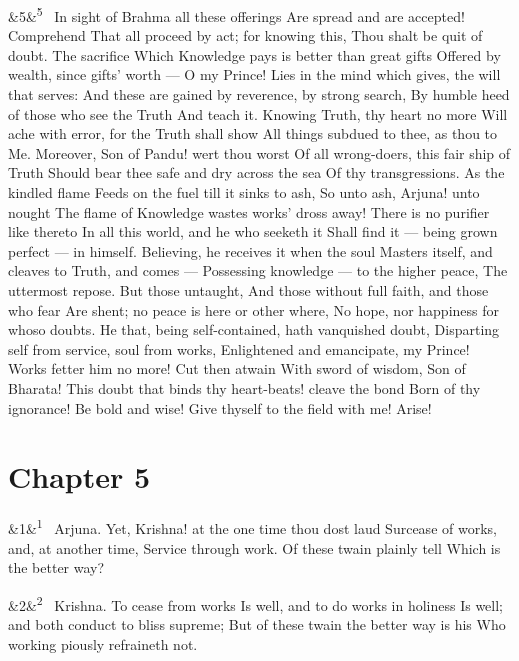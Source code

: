 \documentclass[12pt]{article}
\newcommand{\para}[1][]{\par\noindent\ifx&#1&\else\textsuperscript{\footnotesize #1}~\fi}
\begin{document}
\para[5] In sight of Brahma all these offerings Are spread and are accepted! Comprehend That all proceed by act; for knowing this, Thou shalt be quit of doubt. The sacrifice Which Knowledge pays is better than great gifts Offered by wealth, since gifts' worth --- O my Prince! Lies in the mind which gives, the will that serves: And these are gained by reverence, by strong search, By humble heed of those who see the Truth And teach it. Knowing Truth, thy heart no more Will ache with error, for the Truth shall show All things subdued to thee, as thou to Me. Moreover, Son of Pandu! wert thou worst Of all wrong-doers, this fair ship of Truth Should bear thee safe and dry across the sea Of thy transgressions. As the kindled flame Feeds on the fuel till it sinks to ash, So unto ash, Arjuna! unto nought The flame of Knowledge wastes works' dross away! There is no purifier like thereto In all this world, and he who seeketh it Shall find it --- being grown perfect --- in himself. Believing, he receives it when the soul Masters itself, and cleaves to Truth, and comes --- Possessing knowledge --- to the higher peace, The uttermost repose. But those untaught, And those without full faith, and those who fear Are shent; no peace is here or other where, No hope, nor happiness for whoso doubts. He that, being self-contained, hath vanquished doubt, Disparting self from service, soul from works, Enlightened and emancipate, my Prince! Works fetter him no more! Cut then atwain With sword of wisdom, Son of Bharata! This doubt that binds thy heart-beats! cleave the bond Born of thy ignorance! Be bold and wise! Give thyself to the field with me! Arise!

\section*{Chapter 5}

\para[1] Arjuna. Yet, Krishna! at the one time thou dost laud Surcease of works, and, at another time, Service through work. Of these twain plainly tell Which is the better way?

\para[2] Krishna. To cease from works Is well, and to do works in holiness Is well; and both conduct to bliss supreme; But of these twain the better way is his Who working piously refraineth not.
\end{document}

